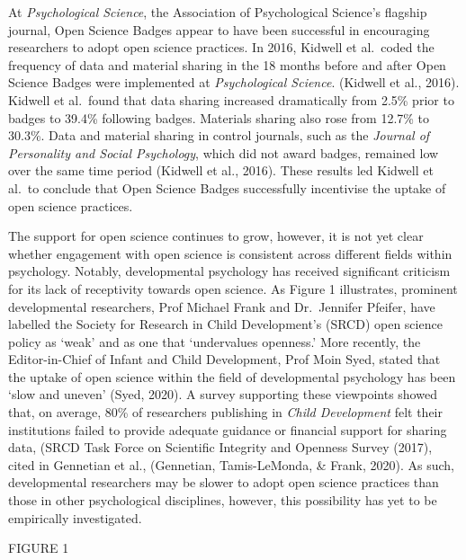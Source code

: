 \documentclass[
  english,
  man]{apa6}
\begin{document}
At \emph{Psychological Science}, the Association of Psychological Science's flagship journal, Open Science Badges appear to have been successful in encouraging researchers to adopt open science practices. In 2016, Kidwell et al.~coded the frequency of data and material sharing in the 18 months before and after Open Science Badges were implemented at \emph{Psychological Science}. (Kidwell et al., 2016). Kidwell et al.~found that data sharing increased dramatically from 2.5\% prior to badges to 39.4\% following badges. Materials sharing also rose from 12.7\% to 30.3\%. Data and material sharing in control journals, such as the \emph{Journal of Personality and Social Psychology}, which did not award badges, remained low over the same time period (Kidwell et al., 2016). These results led Kidwell et al.~to conclude that Open Science Badges successfully incentivise the uptake of open science practices.

The support for open science continues to grow, however, it is not yet clear whether engagement with open science is consistent across different fields within psychology. Notably, developmental psychology has received significant criticism for its lack of receptivity towards open science. As Figure 1 illustrates, prominent developmental researchers, Prof Michael Frank and Dr.~Jennifer Pfeifer, have labelled the Society for Research in Child Development's (SRCD) open science policy as `weak' and as one that `undervalues openness.' More recently, the Editor-in-Chief of Infant and Child Development, Prof Moin Syed, stated that the uptake of open science within the field of developmental psychology has been `slow and uneven' (Syed, 2020). A survey supporting these viewpoints showed that, on average, 80\% of researchers publishing in \emph{Child Development} felt their institutions failed to provide adequate guidance or financial support for sharing data, (SRCD Task Force on Scientific Integrity and Openness Survey (2017), cited in Gennetian et al., (Gennetian, Tamis-LeMonda, \& Frank, 2020). As such, developmental researchers may be slower to adopt open science practices than those in other psychological disciplines, however, this possibility has yet to be empirically investigated.

FIGURE 1
\end{document}
